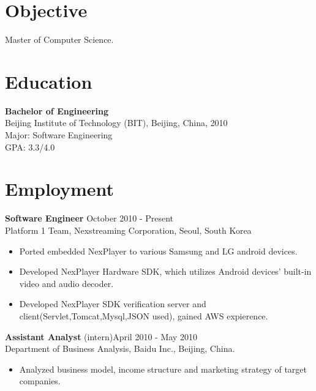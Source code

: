 \documentclass[margin]{res}
\begin{document}
\begin{resume}
 
\section{Objective}  Master of Computer Science. 

\section{Education} {\bf Bachelor of Engineering  } \\
                Beijing Institute of Technology (BIT), Beijing, China,  2010 	\\
                Major: Software Engineering \\
                GPA: 3.3/4.0
 
\section{Employment} 
				{ \bf Software Engineer} \hfill October 2010 - Present \\
                Platform 1 Team, Nexstreaming Corporation, Seoul, South Korea               
                 \begin{itemize}  \itemsep -2pt %
                 \item Ported embedded NexPlayer to various Samsung and LG android devices.
                \item   Developed NexPlayer Hardware SDK, which utilizes Android devices' built-in video and audio decoder.
				\item   Developed NexPlayer SDK verification server and client(Servlet,Tomcat,Mysql,JSON used), gained AWS expierence.
                \end{itemize}
 
                {\bf Assistant Analyst} (intern)\hfill            April 2010 - May 2010 \\
                Department of Business Analysis, Baidu Inc., Beijing, China. 
                 \begin{itemize}  \itemsep -2pt %
                 \item Analyzed business model, income structure and marketing strategy of target companies.
                 \end{itemize} 


\end{resume}
\end{document}
